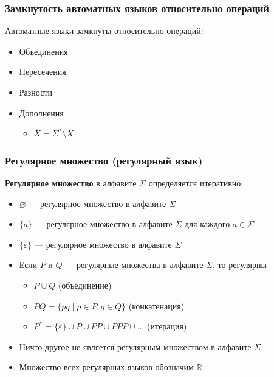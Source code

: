 \documentclass{beamer}
\begin{document}
\begin{frame}[fragile]
  \transwipe[direction=90]
  \frametitle{Замкнутость автоматных языков относительно операций}
  Автоматные языки замкнуты относительно операций:

  \begin{itemize}
    \item Объединения
    \item Пересечения
    \item Разности
    \item Дополнения
    \begin{itemize}
      \item $\overline{X} = \Sigma^* \setminus X$
    \end{itemize}
  \end{itemize}
\end{frame}

\begin{frame}[fragile]
  \transwipe[direction=90]
  \frametitle{Регулярное множество (регулярный язык)}
    \textbf{Регулярное множество} в алфавите $\Sigma$ определяется итеративно:

    \begin{itemize}
      \item $\varnothing $ --- регулярное множество в алфавите $\Sigma$
      \item $\{a\}$  --- регулярное множество в алфавите $\Sigma$ для каждого $a \in \Sigma$
      \item $\{\varepsilon\}$  --- регулярное множество в алфавите $\Sigma$
      \item Если $P$ и $Q$ --- регулярные множества в алфавите $\Sigma$, то регулярны
      \begin{itemize}
        \item $P \cup Q$ \hfill (объединение)
        \item $PQ = \{ pq \mid p \in P, q \in Q\}$ \hfill (конкатенация)
        \item $P^* = \{\varepsilon\} \cup P \cup PP \cup PPP \cup \dots $ \hfill (итерация)
      \end{itemize}
      \item Ничто другое не является регулярным множеством в алфавите $\Sigma$
      \item Множество всех регулярных языков обозначим $\mathbb{R}$
    \end{itemize}
\end{frame}
\end{document}
